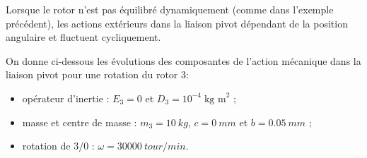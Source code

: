 \documentclass[10pt,fleqn]{article} %
\begin{document}
\begin{prop}
Lorsque le rotor n'est pas équilibré dynamiquement (comme dans l'exemple précédent), les actions extérieurs dans la liaison pivot dépendant de la position angulaire et fluctuent cycliquement.

On donne ci-dessous les évolutions des composantes de l'action mécanique dans la liaison pivot pour une rotation du rotor 3:
\begin{itemize}
\item opérateur d'inertie : $E_3=0$ et $D_3=10^{-4}\;\text{kg m}^2$ ; 
\item masse et centre de masse : $m_3=\SI{10}{kg}$, $c=\SI{0}{mm}$ et $b=\SI{0,05}{mm}$ ; 
\item rotation de $3/0$ : $\omega=\SI{30000}{tour/min}$.
\end{itemize}

\begin{center}


\end{center}
\end{prop}
\end{document}

